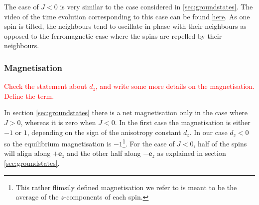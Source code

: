 The case of $J<0$ is very similar to the case considered in \ref{sec:groundstates}. The video of the time evolution corresponding to this case can be found \href{https://folk.ntnu.no/sondrdl/spinwaves/coupled_spins_anti.mp4}{here}. As one spin is tilted, the neighbours tend to oscillate in phase with their neighbours as opposed to the ferromagnetic case where the spins are repelled by their neighbours. 

\subsubsection{Magnetisation}

\textcolor{red}{Check the statement about $d_z$, and write some more details on the magnetisation. Define the term.}

In section \ref{sec:groundstates} there is a net magnetisation only in the case where $J>0$, whereas it is zero when $J<0$. In the first case the magnetisation is either $-1$ or $1$, depending on the sign of the anisotropy constant $d_z$. In our case $d_z < 0$ so the equilibrium magnetisation is $-1$\footnote{This rather flimsily defined magnetisation we refer to is meant to be the average of the $z$-components of each spin.}. For the case of $J<0$, half of the spins will align along $+\mathbf{e}_z$ and the other half along $-\mathbf{e}_z$ as explained in section \ref{sec:groundstates}.